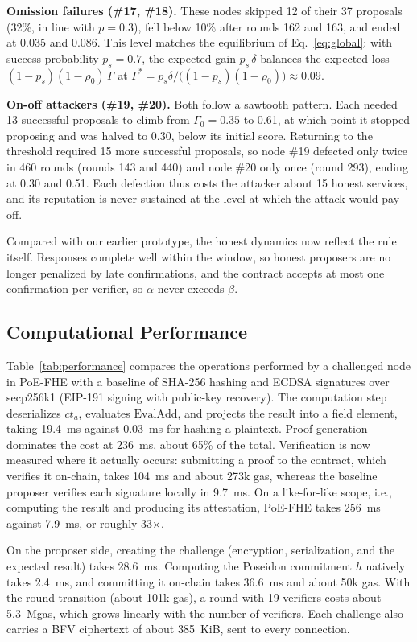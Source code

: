 \documentclass[conference]{IEEEtran}
\begin{document}
\textbf{Omission failures (\#17, \#18).} These nodes skipped 12 of their 37 proposals (32\%, in line with $p = 0.3$), fell below 10\% after rounds 162 and 163, and ended at 0.035 and 0.086. This level matches the equilibrium of Eq.~\eqref{eq:global}: with success probability $p_s = 0.7$, the expected gain $p_s\,\delta$ balances the expected loss $(1-p_s)(1-\rho_0)\,\Gamma$ at $\Gamma^{*} = p_s\delta / \big((1-p_s)(1-\rho_0)\big) \approx 0.09$.

\textbf{On-off attackers (\#19, \#20).} Both follow a sawtooth pattern. Each needed 13 successful proposals to climb from $\Gamma_0 = 0.35$ to 0.61, at which point it stopped proposing and was halved to 0.30, below its initial score. Returning to the threshold required 15 more successful proposals, so node \#19 defected only twice in 460 rounds (rounds 143 and 440) and node \#20 only once (round 293), ending at 0.30 and 0.51. Each defection thus costs the attacker about 15 honest services, and its reputation is never sustained at the level at which the attack would pay off.

Compared with our earlier prototype, the honest dynamics now reflect the rule itself. Responses complete well within the window, so honest proposers are no longer penalized by late confirmations, and the contract accepts at most one confirmation per verifier, so $\alpha$ never exceeds $\beta$.

\subsection{Computational Performance}
Table~\ref{tab:performance} compares the operations performed by a challenged node in PoE-FHE with a baseline of SHA-256 hashing and ECDSA signatures over secp256k1 (EIP-191 signing with public-key recovery). The computation step deserializes $\mathit{ct}_a$, evaluates $\mathrm{EvalAdd}$, and projects the result into a field element, taking 19.4~ms against 0.03~ms for hashing a plaintext. Proof generation dominates the cost at 236~ms, about 65\% of the total. Verification is now measured where it actually occurs: submitting a proof to the contract, which verifies it on-chain, takes 104~ms and about 273k gas, whereas the baseline proposer verifies each signature locally in 9.7~ms. On a like-for-like scope, i.e., computing the result and producing its attestation, PoE-FHE takes 256~ms against 7.9~ms, or roughly 33$\times$.

On the proposer side, creating the challenge (encryption, serialization, and the expected result) takes 28.6~ms. Computing the Poseidon commitment $h$ natively takes 2.4~ms, and committing it on-chain takes 36.6~ms and about 50k gas. With the round transition (about 101k gas), a round with 19 verifiers costs about 5.3~Mgas, which grows linearly with the number of verifiers. Each challenge also carries a BFV ciphertext of about 385~KiB, sent to every connection.
\end{document}
